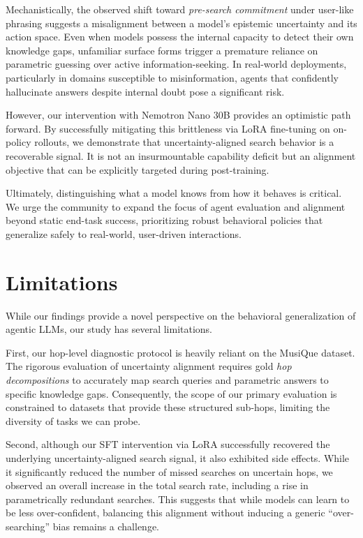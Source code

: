\documentclass[10pt, letterpaper]{article}
\begin{document}
Mechanistically, the observed shift toward \emph{pre-search commitment} under user-like phrasing suggests a misalignment between a model's epistemic uncertainty and its action space. Even when models possess the internal capacity to detect their own knowledge gaps, unfamiliar surface forms trigger a premature reliance on parametric guessing over active information-seeking. In real-world deployments, particularly in domains susceptible to misinformation, agents that confidently hallucinate answers despite internal doubt pose a significant risk. 

However, our intervention with Nemotron Nano 30B provides an optimistic path forward. By successfully mitigating this brittleness via LoRA fine-tuning on on-policy rollouts, we demonstrate that uncertainty-aligned search behavior is a recoverable signal. It is not an insurmountable capability deficit but an alignment objective that can be explicitly targeted during post-training. 

Ultimately, distinguishing what a model knows from how it behaves is critical. We urge the community to expand the focus of agent evaluation and alignment beyond static end-task success, prioritizing robust behavioral policies that generalize safely to real-world, user-driven interactions.
\section{Limitations}

While our findings provide a novel perspective on the behavioral generalization of agentic LLMs, our study has several limitations.

First, our hop-level diagnostic protocol is heavily reliant on the MusiQue dataset. The rigorous evaluation of uncertainty alignment requires gold \emph{hop decompositions} to accurately map search queries and parametric answers to specific knowledge gaps. Consequently, the scope of our primary evaluation is constrained to datasets that provide these structured sub-hops, limiting the diversity of tasks we can probe.

Second, although our SFT intervention via LoRA successfully recovered the underlying uncertainty-aligned search signal, it also exhibited side effects. While it significantly reduced the number of missed searches on uncertain hops, we observed an overall increase in the total search rate, including a rise in parametrically redundant searches. This suggests that while models can learn to be less over-confident, balancing this alignment without inducing a generic ``over-searching'' bias remains a challenge.
\end{document}
